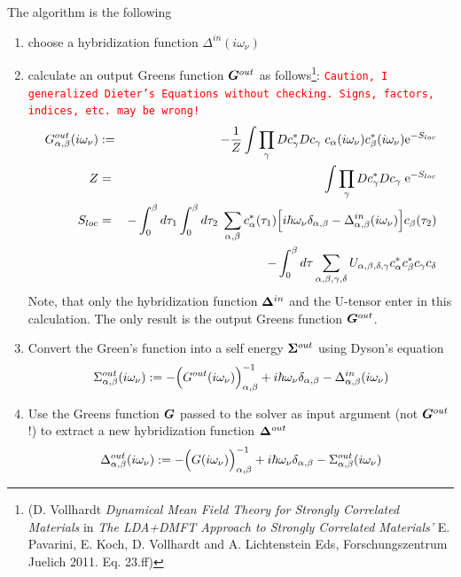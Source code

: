 \documentclass[11pt,a4paper]{report}
\newcommand{\petertt}[1]{\textcolor{red}{\texttt{#1}}}
\begin{document}
The algorithm is the following
\begin{enumerate}
\item choose a hybridization function $\Delta^{in}(i\omega_\nu)$
\item calculate an output Greens function $\bm{G}^{out}$ as
  follows\footnote{(D. Vollhardt \textit{Dynamical Mean Field Theory
      for Strongly Correlated Materials} in \textit{The LDA+DMFT
      Approach to Strongly Correlated Materials'} E. Pavarini,
    E. Koch, D. Vollhardt and A. Lichtenstein Eds, Forschungszentrum
    Juelich 2011. Eq. 23.ff)}: \petertt{Caution, I
      generalized Dieter's Equations without checking. Signs, factors,
      indices, etc. may be wrong!}
\begin{eqnarray*}
G^{out}_{\alpha,\beta}(i\omega_\nu)&:=&
-\frac{1}{Z}\int\prod_{\gamma} Dc^*_\gamma Dc_\gamma\;
c_\alpha(i\omega_\nu)c^*_\beta(i\omega_\nu) \mathrm{e}^{-S_{loc}}
\\
Z&=&\int\prod_{\gamma} Dc^*_\gamma Dc_\gamma\;\mathrm{e}^{-S_{loc}}
\\
S_{loc}&=&-\int_0^\beta d\tau_1\int_0^\beta d\tau_2\;
\sum_{\alpha,\beta}c^*_\alpha(\tau_1)
\Bigl[
i\hbar\omega_\nu\delta_{\alpha,\beta}-\Delta^{in}_{\alpha,\beta}(i\omega_\nu)
\Bigr]
c_\beta(\tau_2)
\nonumber\\
&&-\int_0^\beta d\tau \sum_{\alpha,\beta,\gamma,\delta}
U_{\alpha,\beta,\delta,\gamma}
 c^*_\alpha c^*_\beta c_\gamma c_\delta
\end{eqnarray*}
Note, that only the hybridization function $\bm{\Delta}^{in}$ and the
  U-tensor enter in this calculation. The only result is the output
  Greens function $\bm{G}^{out}$.
%
\item Convert the Green's function into a self energy $\bm{\Sigma}^{out}$
  using Dyson's equation
\begin{eqnarray}
\Sigma^{out}_{\alpha,\beta}(i\omega_\nu)
:=-\Bigl(G^{out}(i\omega_\nu)\Bigr)^{-1}_{\alpha,\beta}
+i\hbar\omega_\nu\delta_{\alpha,\beta}
-\Delta^{in}_{\alpha,\beta}(i\omega_\nu)
\label{eq:sigmaout}
\end{eqnarray}
%
\item Use the Greens function $\bm{G}$ passed
  to the solver as input argument (not
  $\bm{G}^{out}$!)  to extract a new
  hybridization function $\bm{\Delta}^{out}$
\begin{eqnarray}
\Delta^{out}_{\alpha,\beta}(i\omega_\nu)
:=-\Bigl(G(i\omega_\nu)\Bigr)^{-1}_{\alpha,\beta}
+i\hbar\omega_\nu\delta_{\alpha,\beta}-\Sigma^{out}_{\alpha,\beta}(i\omega_\nu)
\label{eq:deltaout}
\end{eqnarray}
\end{enumerate}
\end{document}
